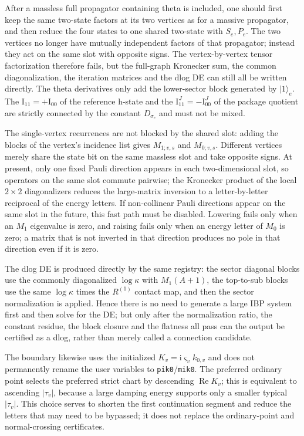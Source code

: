 \documentclass[11pt,a4paper]{article}
\newcommand{\ii}{\mathrm i}
\begin{document}
After a massless full propagator containing theta is included, one should first keep the same two-state factors at its two vertices as for a massive propagator, and then reduce the four states to one shared two-state with $S_e,P_e$. The two vertices no longer have mutually independent factors of that propagator; instead they act on the same slot with opposite signs. The vertex-by-vertex tensor factorization therefore fails, but the full-graph Kronecker sum, the common diagonalization, the iteration matrices and the dlog DE can still all be written directly. The theta derivatives only add the lower-sector block generated by $|1\rangle_e$. The $\text{I}_{11}=+\text{I}_{00}$ of the reference h-state and the $\text{I}_{11}^J=-\text{I}_{00}^J$ of the package quotient are strictly connected by the constant $D_{\sigma_e}$ and must not be mixed.

The single-vertex recurrences are not blocked by the shared slot: adding the blocks of the vertex's incidence list gives $M_{1;v,s}$ and $M_{0;v,s}$. Different vertices merely share the state bit on the same massless slot and take opposite signs. At present, only one fixed Pauli direction appears in each two-dimensional slot, so operators on the same slot commute pairwise; the Kronecker product of the local $2\times2$ diagonalizers reduces the large-matrix inversion to a letter-by-letter reciprocal of the energy letters. If non-collinear Pauli directions appear on the same slot in the future, this fast path must be disabled. Lowering fails only when an $M_1$ eigenvalue is zero, and raising fails only when an energy letter of $M_0$ is zero; a matrix that is not inverted in that direction produces no pole in that direction even if it is zero.

The dlog DE is produced directly by the same registry: the sector diagonal blocks use the commonly diagonalized $\log\kappa$ with $M_1(A+1)$, the top-to-sub blocks use the same $\log\kappa$ times the $R^{(1)}$ contact map, and then the sector normalization is applied. Hence there is no need to generate a large IBP system first and then solve for the DE; but only after the normalization ratio, the constant residue, the block closure and the flatness all pass can the output be certified as a dlog, rather than merely called a connection candidate.

The boundary likewise uses the initialized $K_v=\ii\varsigma_vk_{0,v}$ and does not permanently rename the user variables to \texttt{pik0}/\texttt{mik0}. The preferred ordinary point selects the preferred strict chart by descending $\operatorname{Re}K_v$; this is equivalent to ascending $|\tau_v|$, because a large damping energy supports only a smaller typical $|\tau_v|$. This choice serves to shorten the first continuation segment and reduce the letters that may need to be bypassed; it does not replace the ordinary-point and normal-crossing certificates.
\end{document}
